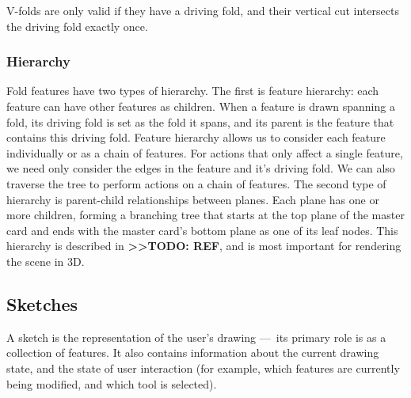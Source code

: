 V-folds are only valid if they have a driving fold, and their vertical
cut intersects the driving fold exactly once.

\subsubsection{Hierarchy}\label{hierarchy}

Fold features have two types of hierarchy. The first is feature
hierarchy: each feature can have other features as children. When a
feature is drawn spanning a fold, its driving fold is set as the fold it
spans, and its parent is the feature that contains this driving fold.
Feature hierarchy allows us to consider each feature individually or as
a chain of features. For actions that only affect a single feature, we
need only consider the edges in the feature and it's driving fold. We
can also traverse the tree to perform actions on a chain of features.
The second type of hierarchy is parent-child relationships between
planes. Each plane has one or more children, forming a branching tree
that starts at the top plane of the master card and ends with the master
card's bottom plane as one of its leaf nodes. This hierarchy is
described in \textbf{\textgreater{}\textgreater{}TODO: REF}, and is most
important for rendering the scene in 3D.

\subsection{Sketches}\label{sketches}

A sketch is the representation of the user's drawing ---~its primary
role is as a collection of features. It also contains information about
the current drawing state, and the state of user interaction (for
example, which features are currently being modified, and which tool is
selected).

